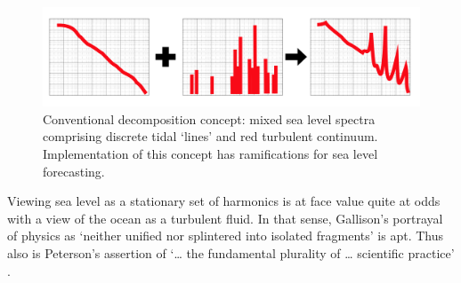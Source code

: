 \begin{figure}
\begin{center}
\includegraphics[width=120mm]{figures/diagrams/spectra_cartoon_1.png}
\caption{Conventional decomposition concept: mixed sea level spectra comprising discrete tidal `lines' and red turbulent continuum.  Implementation of this concept has ramifications for sea level forecasting.}
\label{fig:SPECTRA_CARTOON}
\end{center}
\end{figure}


Viewing sea level as a stationary set of harmonics is at face value quite at odds with a view of the ocean as a turbulent fluid.   In that sense, Gallison's portrayal of physics as `neither unified nor splintered into isolated fragments' \citep[pp 782]{Galison:1987wh} is apt.  Thus also is Peterson's assertion of `\dots{} the fundamental plurality of \dots{} scientific practice' \cite{Petersen:2012tr}. 
